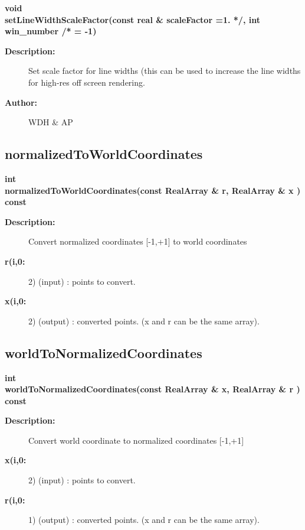 \begin{flushleft} \textbf{%
void  \\ 
\settowidth{\GLGraphicsInterfaceIncludeArgIndent}{setLineWidthScaleFactor(}%
setLineWidthScaleFactor(const real \& scaleFactor  =1. */, int win\_number /* = -1)
}\end{flushleft}
\begin{description}
\item[{\bf Description:}] 
 Set scale factor for line widths (this can be used to increase the line widths for
 high-res off screen rendering.
\item[{\bf Author:}]  WDH \& AP
\end{description}
\subsection{normalizedToWorldCoordinates}
 
\begin{flushleft} \textbf{%
int  \\ 
\settowidth{\GLGraphicsInterfaceIncludeArgIndent}{normalizedToWorldCoordinates(}%
normalizedToWorldCoordinates(const RealArray \& r, RealArray \& x ) const
}\end{flushleft}
\begin{description}
\item[{\bf Description:}] 
 Convert normalized coordinates [-1,+1] to world coordinates
\item[{\bf r(i,0:}] 2) (input) : points to convert.
\item[{\bf x(i,0:}] 2) (output) : converted points. (x and r can be the same array).

\end{description}
\subsection{worldToNormalizedCoordinates}
 
\begin{flushleft} \textbf{%
int  \\ 
\settowidth{\GLGraphicsInterfaceIncludeArgIndent}{worldToNormalizedCoordinates(}%
worldToNormalizedCoordinates(const RealArray \& x, RealArray \& r ) const
}\end{flushleft}
\begin{description}
\item[{\bf Description:}] 
 Convert world coordinate to normalized coordinates [-1,+1] 
\item[{\bf x(i,0:}] 2) (input) : points to convert.
\item[{\bf r(i,0:}] 1) (output) : converted points. (x and r can be the same array).

\end{description}
